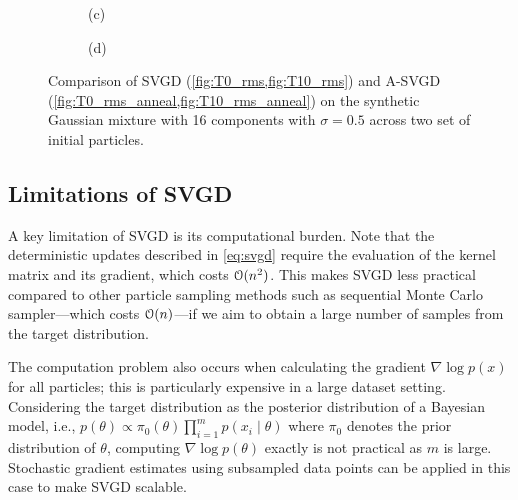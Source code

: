 \begin{figure}[t!]
\begin{subfigure}[b]{.48\textwidth}
    \caption{(c)\label{fig:T0_rms_anneal}}
\end{subfigure}
\hfill
\centering
\begin{subfigure}[b]{0.48\textwidth}
    \caption{(d)\label{fig:T10_rms_anneal}}
\end{subfigure}
\caption{Comparison of SVGD (\cref{fig:T0_rms,fig:T10_rms}) and A-SVGD (\cref{fig:T0_rms_anneal,fig:T10_rms_anneal}) on the synthetic Gaussian mixture with 16 components with $\sigma = 0.5$ across two set of initial particles. }
\label{fig:SVGD_ASVGD}
\end{figure}


\subsection{Limitations of SVGD} 

A key limitation of SVGD is its
computational burden. Note that the deterministic updates described in \cref{eq:svgd} require the
evaluation of the kernel matrix and its gradient, which costs $\mathcal{O}(n^2)$.
This makes SVGD less practical compared to other particle sampling methods
such as sequential Monte Carlo sampler---which costs $\mathcal{O}(n)$---if we aim to
obtain a large number of samples from the target distribution.

The computation problem also occurs when calculating the gradient $\nabla \log
p(x)$ for all particles; this is particularly expensive in a large dataset
setting. Considering the target distribution as the posterior distribution
of a Bayesian model, i.e., $p(\theta) \propto \pi_0(\theta)\prod_{i = 1}^{m}
p(x_i \mid \theta)$ where $\pi_0$ denotes the prior distribution of $\theta$,
computing $\nabla \log p(\theta)$ exactly is not practical as $m$ is large.
Stochastic gradient estimates using subsampled data points can be applied in this case to make SVGD scalable.


